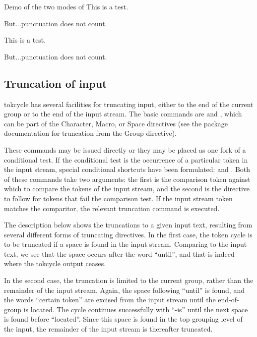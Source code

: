 \documentclass[10pt]{article}
\newcommand\TokCycle{\textsf{tokcycle}}
\begin{document}
\begin{exampleA}[lefthand width=5.6cm]{Demo of the two modes of 
  }
\countem 
This is a test.

But...punctuation does not count.
\endcountem

\bigskip\runningcounttrue
\countem 
This is a test.

But...punctuation does not count.
\endcountem
\end{exampleA}

\endgroup

\subsection{Truncation of input}

\begingroup

\TokCycle{} has several facilities for truncating input, either
  to the end of the current group or to the end of the input stream.
The basic commands are  and ,
  which can be part of the Character, Macro, or Space directives (see the
  package documentation for truncation from the Group directive).

\medskip
These commands may be issued directly or they may be placed as
  one fork of a conditional test.
If the conditional test is the occurrence of a particular token in the
  input stream, special conditional shortcuts have been formulated:
   and .
Both of these commands take two arguments: the first is the comparison
  token against which to compare the tokens of the input stream, and the
  second is the directive to follow for tokens that fail the 
  comparison test.
If the input stream token matches the comparitor, the relevant 
  truncation command is executed.

\medskip
The description below shows the truncations to a given input text,
  resulting from several different forms of truncating directives.
In the first case, the token cycle is to be truncated if a space
  is found in the input stream.
Comparing to the input text, we see that the space occurs after the
  word ``until'', and that is indeed where the \TokCycle{} output
  ceases.

\medskip
In the second case, the truncation is limited to the current group,
  rather than the remainder of the input stream.
Again, the space following ``until'' is found, and the words
  ``certain token'' are excised from the input stream until the
  end-of-group is located.
The cycle continues successfully with ``-is'' until the next space
  is found before ``located''.
Since this space is found in the top grouping level of the input,
  the remainder of the input stream is thereafter truncated.
\end{document}
